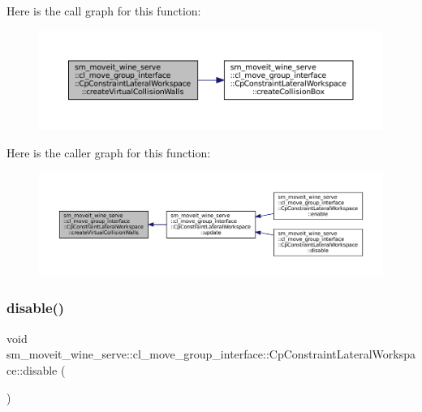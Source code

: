 Here is the call graph for this function\+:
\nopagebreak
\begin{figure}[H]
\begin{center}
\leavevmode
\includegraphics[width=350pt]{classsm__moveit__wine__serve_1_1cl__move__group__interface_1_1CpConstraintLateralWorkspace_aeedef6f788c390a37d6b74d90873f547_cgraph}
\end{center}
\end{figure}
Here is the caller graph for this function\+:
\nopagebreak
\begin{figure}[H]
\begin{center}
\leavevmode
\includegraphics[width=350pt]{classsm__moveit__wine__serve_1_1cl__move__group__interface_1_1CpConstraintLateralWorkspace_aeedef6f788c390a37d6b74d90873f547_icgraph}
\end{center}
\end{figure}
\mbox{\label{classsm__moveit__wine__serve_1_1cl__move__group__interface_1_1CpConstraintLateralWorkspace_a52e23577f44d458497ae76f2019120da}} 
\subsubsection{\texorpdfstring{disable()}{disable()}}
{\footnotesize\ttfamily void sm\+\_\+moveit\+\_\+wine\+\_\+serve\+::cl\+\_\+move\+\_\+group\+\_\+interface\+::\+Cp\+Constraint\+Lateral\+Workspace\+::disable (\begin{DoxyParamCaption}{ }\end{DoxyParamCaption})}



